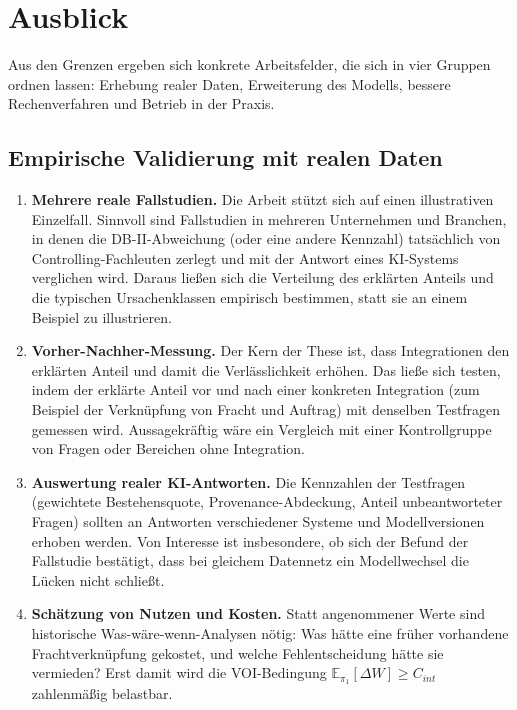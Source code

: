 \documentclass[a4paper,12pt,twoside]{report}
\theoremstyle{definition}
\newcommand{\E}{\mathbb{E}}
\begin{document}
\section{Ausblick}
Aus den Grenzen ergeben sich konkrete Arbeitsfelder, die sich in vier Gruppen ordnen lassen: Erhebung realer Daten, Erweiterung des Modells, bessere Rechenverfahren und Betrieb in der Praxis.

\subsection{Empirische Validierung mit realen Daten}
\begin{enumerate}
\item \textbf{Mehrere reale Fallstudien.} Die Arbeit stützt sich auf einen illustrativen Einzelfall. Sinnvoll sind Fallstudien in mehreren Unternehmen und Branchen, in denen die DB-II-Abweichung (oder eine andere Kennzahl) tatsächlich von Controlling-Fachleuten zerlegt und mit der Antwort eines KI-Systems verglichen wird. Daraus ließen sich die Verteilung des erklärten Anteils und die typischen Ursachenklassen empirisch bestimmen, statt sie an einem Beispiel zu illustrieren.
\item \textbf{Vorher-Nachher-Messung.} Der Kern der These ist, dass Integrationen den erklärten Anteil und damit die Verlässlichkeit erhöhen. Das ließe sich testen, indem der erklärte Anteil vor und nach einer konkreten Integration (zum Beispiel der Verknüpfung von Fracht und Auftrag) mit denselben Testfragen gemessen wird. Aussagekräftig wäre ein Vergleich mit einer Kontrollgruppe von Fragen oder Bereichen ohne Integration.
\item \textbf{Auswertung realer KI-Antworten.} Die Kennzahlen der Testfragen (gewichtete Bestehensquote, Provenance-Abdeckung, Anteil unbeantworteter Fragen) sollten an Antworten verschiedener Systeme und Modellversionen erhoben werden. Von Interesse ist insbesondere, ob sich der Befund der Fallstudie bestätigt, dass bei gleichem Datennetz ein Modellwechsel die Lücken nicht schließt.
\item \textbf{Schätzung von Nutzen und Kosten.} Statt angenommener Werte sind historische Was-wäre-wenn-Analysen nötig: Was hätte eine früher vorhandene Frachtverknüpfung gekostet, und welche Fehlentscheidung hätte sie vermieden? Erst damit wird die VOI-Bedingung $\E_{\pi_1}[\Delta W]\ge C_{int}$ zahlenmäßig belastbar.
\end{enumerate}
\end{document}
